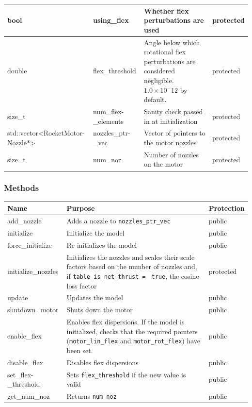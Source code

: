 \documentclass[11pt,fleqn]{report}
\begin{document}
\begin{center}
\begin{longtable}{|p{2.75cm}|p{2.8cm}|p{7.1cm}|l|}
\hline
bool & using\_flex & Whether flex perturbations are used & protected \\
\hline
double & flex\_threshold & Angle below which rotational flex perturbations are considered negligible. $1.0\times 10^-12$ by default. & protected \\
\hline
size\_t & num\_flex-\newline\_elements & Sanity check passed in at initialization & protected \\
\hline
std::vector\newline  <RocketMotor-\newline Nozzle*> & nozzles\_ptr-\newline \_vec & Vector of pointers to the motor nozzles & protected \\
\hline
size\_t & num\_noz & Number of nozzles on the motor & protected \\
\hline
\end{longtable}
\end{center}

\subsubsection{Methods}
\begin{center}
\begin{longtable}{|p{3cm}|p{10cm}|l|} \hline
\textbf{Name} & \textbf{Purpose} & \textbf{Protection} \\
\hline
\endhead
add\_nozzle & Adds a nozzle to \verb|nozzles_ptr_vec| & public \\
\hline
initialize & Initialize the model & public \\
\hline
force\_initialize & Re-initializes the model & public \\
\hline
initialize\_nozzles & Initializes the nozzles and scales their scale factors based on the number of nozzles and, if \verb|table_is_net_thrust = | \newline \verb|true|, the cosine loss factor & protected \\
\hline
update & Updates the model & public \\
\hline
shutdown\_motor & Shuts down the motor & public \\
\hline
enable\_flex & Enables flex dispersions. If the model is initialized, checks that the required pointers (\verb|motor_lin_flex| and \newline \verb|motor_rot_flex|) have been set. & public \\
\hline
disable\_flex & Disables flex dispersions & public \\
\hline
set\_flex-\newline \_threshold & Sets \verb|flex_threshold| if the new value is valid & public \\
\hline
get\_num\_noz & Returns \verb|num_noz| & public \\
\hline
\end{longtable}
\end{center}
\end{document}
